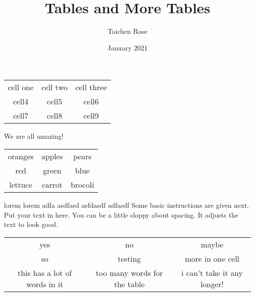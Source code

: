 \documentclass{article}
\title{Tables and More Tables}
\author{Taichen Rose}
\date{January 2021}
\begin{document}
\maketitle
\begin{center}
\begin{tabular}{ c c c }
 cell one & cell two & cell three \\ 
 cell4 & cell5 & cell6 \\  
 cell7 & cell8 & cell9    
\end{tabular}
\end{center}

We are all amazing!

\begin{center}
\begin{tabular}{ |c|c|c| } 
 \hline
 oranges & apples & pears \\ 
 red & green & blue \\ 
 lettuce & carrot & brocoli \\ 
 \hline
\end{tabular}
\end{center}

lorem lorem adfa asdfasd asfdasdf adfasdf 
\medskip
Some basic instructions are given next.
Put your text in here.  You can be a little sloppy    about
spacing.  It adjusts the text to look good.

\begin{center}
\begin{tabular}{ |c|c|c| } 
 \hline
 yes & no & maybe \\ 
 so & testing & more in one cell \\ 
 this has a lot of words in it & too many words for the table & i can't take it any longer! \\ 
 \hline
\end{tabular}
\end{center}
\end{document}
